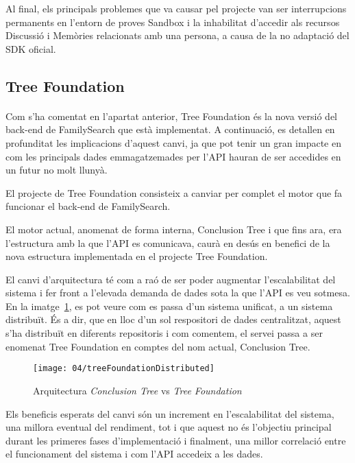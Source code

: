     Al final, els principals problemes que va causar pel projecte van ser interrupcions permanents en l'entorn de proves Sandbox i la inhabilitat d’accedir als recursos Discussió i Memòries relacionats amb una persona, a causa de la no adaptació del SDK oficial.


    \subsection{Tree Foundation}

    \paragraph{}
    Com s'ha comentat en l'apartat anterior, Tree Foundation és la nova versió del back-end de FamilySearch que està implementat. A continuació, es detallen en profunditat les implicacions d'aquest canvi, ja que pot tenir un gran impacte en com les principals dades emmagatzemades per l'API hauran de ser accedides en un futur no molt llunyà.

    El projecte de Tree Foundation consisteix a canviar per complet el motor que fa funcionar el back-end de FamilySearch.

    El motor actual, anomenat de forma interna, Conclusion Tree i que fins ara, era l’estructura amb la que l'API es comunicava, caurà en desús en benefici de la nova estructura implementada en el projecte Tree Foundation.

    El canvi d’arquitectura té com a raó de ser poder augmentar l’escalabilitat del sistema i fer front a l'elevada demanda de dades sota la que l'API es veu sotmesa. En la imatge~\ref{fig:architecture}, es pot veure com es passa d’un sistema unificat, a un sistema distribuït. És a dir, que en lloc d'un sol respositori de dades centralitzat, aquest s'ha distribuït en diferents repositoris i com comentem, el servei passa a ser enomenat Tree Foundation en comptes del nom actual, Conclusion Tree.

    \begin{figure}[h]
        \texttt{[image: 04/treeFoundationDistributed]}
        \centering
        \caption{Arquitectura \emph{Conclusion Tree} vs \emph{Tree Foundation}\label{fig:architecture}}
    \end{figure}

    Els beneficis esperats del canvi són un increment en l'escalabilitat del sistema, una millora eventual del rendiment, tot i que aquest no és l’objectiu principal durant les primeres fases d’implementació i finalment, una millor correlació entre el funcionament del sistema i com l'API accedeix a les dades.

